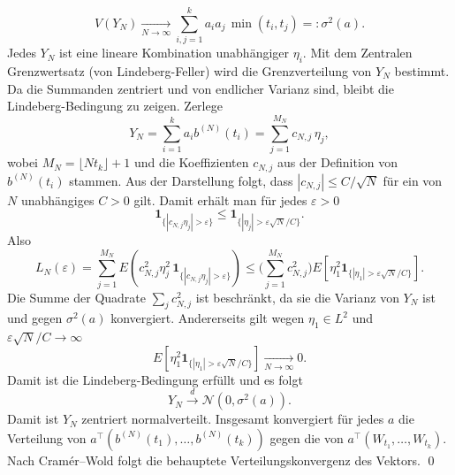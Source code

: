 \begin{satz}
$$
V(Y_N)\xrightarrow[N\to\infty]{}\sum_{i,j=1}^k a_i a_j\,\min(t_i,t_j)=:\sigma^2(a).
$$
Jedes $Y_N$ ist eine lineare Kombination unabhängiger $\eta_i$. Mit dem Zentralen Grenzwertsatz (von Lindeberg-Feller) wird die Grenzverteilung von $Y_N$ bestimmt.
Da die Summanden zentriert und von endlicher Varianz sind, bleibt die Lindeberg-Bedingung zu zeigen. Zerlege
$$
Y_N=\sum_{i=1}^k a_i b^{(N)}(t_i)=\sum_{j=1}^{M_N} c_{N,j}\,\eta_j,
$$
wobei $M_N=\lfloor Nt_k\rfloor+1$ und die Koeffizienten $c_{N,j}$ aus der Definition von $b^{(N)}(t_i)$ stammen.
Aus der Darstellung folgt, dass $|c_{N,j}|\le C/\sqrt N$ für ein von $N$ unabhängiges $C>0$ gilt.
Damit erhält man für jedes $\varepsilon>0$
$$
\mathbf 1_{\{|c_{N,j}\eta_j|>\varepsilon\}}
\le \mathbf 1_{\{|\eta_j|>\varepsilon\sqrt N/C\}}.
$$
Also
$$
L_N(\varepsilon) = \sum_{j=1}^{M_N} E \left (c_{N,j}^2\eta_j^2\,\mathbf 1_{\{|c_{N,j}\eta_j|>\varepsilon\}} \right )
\le \Big(\sum_{j=1}^{M_N} c_{N,j}^2 \Big) E \left [ \eta_1^2\mathbf 1_{\{|\eta_1|>\varepsilon\sqrt N/C\}} \right ].
$$
Die Summe der Quadrate $\sum_j c_{N,j}^2$ ist beschränkt, da sie die Varianz von $Y_N$ ist und gegen
$\sigma^2(a)$ konvergiert. Andererseits gilt wegen $\eta_1\in L^2$ und $\varepsilon\sqrt N/C \to \infty$
$$
E \left [ \eta_1^2\mathbf 1_{\{|\eta_1|>\varepsilon\sqrt N/C\}} \right ] \xrightarrow[N\to\infty]{}0.
$$
Damit ist die Lindeberg-Bedingung erfüllt und es folgt
$$
Y_N \xrightarrow{d} \mathcal N(0,\sigma^2(a)).
$$
Damit ist $Y_N$ zentriert normalverteilt. Insgesamt konvergiert für jedes $a$ die Verteilung von $a^\top(b^{(N)}(t_1),\dots,b^{(N)}(t_k))$ gegen die von $a^\top(W_{t_1},\dots,W_{t_k})$.
Nach Cramér–Wold folgt die behauptete Verteilungskonvergenz des Vektors. \qed
\end{satz}

